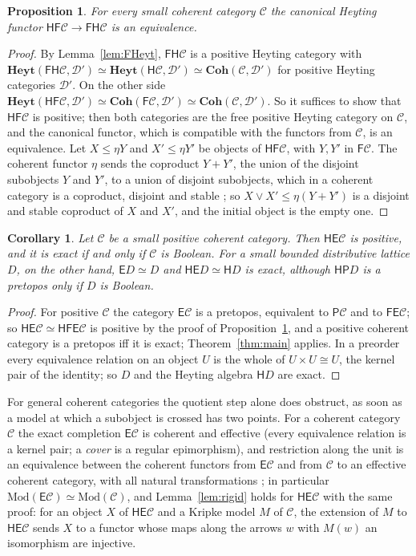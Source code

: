 \documentclass[11pt]{amsart}
\newtheorem{cor}[thm]{Corollary}
\newtheorem{prop}[thm]{Proposition}
\theoremstyle{definition}
\newcommand{\Coh}{\mathbf{Coh}}
\newcommand{\Heyt}{\mathbf{Heyt}}
\newcommand{\Mod}{\mathrm{Mod}}
\newcommand{\FF}{\mathsf F}
\newcommand{\EE}{\mathsf E}
\newcommand{\PP}{\mathsf P}
\newcommand{\HH}{\mathsf H}
\newcommand{\cC}{\mathcal C}
\newcommand{\cD}{\mathcal D}
\begin{document}
\begin{prop}\label{prop:F}
For every small coherent category $\cC$ the canonical Heyting functor
$\HH\FF\cC\to\FF\HH\cC$ is an equivalence.
\end{prop}
\begin{proof}
By Lemma~\ref{lem:FHeyt}, $\FF\HH\cC$ is a positive Heyting category
with $\Heyt(\FF\HH\cC,\cD')\simeq\Heyt(\HH\cC,\cD')\simeq\Coh(\cC,
\cD')$ for positive Heyting categories $\cD'$. On the other side
$\Heyt(\HH\FF\cC,\cD')\simeq\Coh(\FF\cC,\cD')\simeq\Coh(\cC,\cD')$. So
it suffices to show that $\HH\FF\cC$ is positive; then both categories
are the free positive Heyting category on $\cC$, and the canonical
functor, which is compatible with the functors from $\cC$, is an
equivalence. Let $X\le\eta Y$ and $X'\le\eta Y'$ be objects of
$\HH\FF\cC$, with $Y,Y'$ in $\FF\cC$. The coherent functor $\eta$
sends the coproduct $Y+Y'$, the union of the disjoint subobjects $Y$
and $Y'$, to a union of disjoint subobjects, which in a coherent
category is a coproduct, disjoint and stable \cite[A1.4]{Elephant}; so
$X\vee X'\le\eta(Y+Y')$ is a disjoint and stable coproduct of $X$ and
$X'$, and the initial object is the empty one.
\end{proof}

\begin{cor}\label{cor:E}
Let $\cC$ be a small positive coherent category. Then $\HH\EE\cC$ is
positive, and it is exact if and only if $\cC$ is Boolean. For a
small bounded distributive lattice $D$, on the other hand, $\EE D\simeq D$ and
$\HH\EE D\simeq\HH D$ is exact, although $\HH\PP D$ is a pretopos only
if $D$ is Boolean.
\end{cor}
\begin{proof}
For positive $\cC$ the category $\EE\cC$ is a pretopos, equivalent to
$\PP\cC$ and to $\FF\EE\cC$; so $\HH\EE\cC\simeq\HH\FF\EE\cC$ is
positive by the proof of Proposition~\ref{prop:F}, and a positive
coherent category is a pretopos iff it is exact;
Theorem~\ref{thm:main} applies. In a preorder every equivalence
relation on an object $U$ is the whole of $U\times U\cong U$, the
kernel pair of the identity; so $D$ and the Heyting algebra $\HH D$ are
exact.
\end{proof}

For general coherent categories the quotient step alone does obstruct,
as soon as a model at which a subobject is crossed has two points. For
a coherent category $\cC$ the exact completion $\EE\cC$ is coherent and
effective (every equivalence relation is a kernel pair; a \emph{cover}
is a regular epimorphism), and restriction along the unit is an equivalence between the
coherent functors from $\EE\cC$ and from $\cC$ to an effective coherent
category, with all natural transformations \cite{TheoryComp}; in
particular $\Mod(\EE\cC)\simeq\Mod(\cC)$, and Lemma~\ref{lem:rigid}
holds for $\HH\EE\cC$ with the same proof: for an object $X$ of
$\HH\EE\cC$ and a Kripke model $M$ of $\cC$, the extension of $M$ to
$\HH\EE\cC$ sends $X$ to a functor whose maps along the arrows $w$ with
$M(w)$ an isomorphism are injective.
\end{document}
